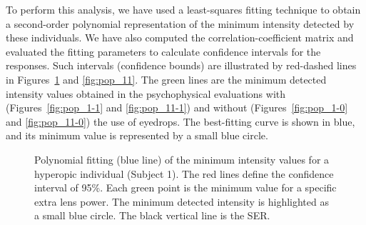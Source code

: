 To perform this analysis, we have used a least-squares fitting technique to obtain a second-order polynomial representation of the minimum intensity detected by these individuals. We have also computed the correlation-coefficient matrix and evaluated the fitting parameters to calculate confidence intervals for the responses. Such intervals (confidence bounds) are illustrated by red-dashed lines in Figures~\ref{fig:pop_1} and \ref{fig:pop_11}. The green lines are the minimum detected intensity values obtained in the psychophysical evaluations with (Figures~\ref{fig:pop_1-1} and \ref{fig:pop_11-1}) and without (Figures~\ref{fig:pop_1-0} and \ref{fig:pop_11-0}) the use of eyedrops. The best-fitting curve is shown in blue, and its minimum value is represented by a small blue circle.

\begin{figure}[!b]
	\centering
	
	
	
	\caption[Polynomial fitting of the absolute threshold values of Subject 1]{Polynomial fitting (blue line) of the minimum intensity values for a hyperopic individual (Subject 1). The red lines define the confidence interval of 95\%. Each green point is the minimum value for a specific extra lens power. The minimum detected intensity is highlighted as a small blue circle. The black vertical line is the SER.}
	\label{fig:pop_1}
\end{figure}

